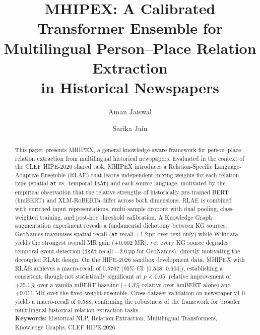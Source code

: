 \documentclass[11pt,a4paper]{article}
\begin{document}
\title{MHIPEX: A Calibrated Transformer Ensemble for\\Multilingual Person--Place Relation Extraction\\in Historical Newspapers}

\author{Aman Jaiswal}
\author{Sarika Jain}
\date{}

\maketitle

\begin{abstract}
This paper presents MHIPEX, a general knowledge-aware framework for person--place relation extraction from multilingual historical newspapers. Evaluated in the context of the CLEF HIPE-2026 shared task, MHIPEX introduces a Relation-Specific Language-Adaptive Ensemble (RLAE) that learns independent mixing weights for each relation type (spatial \texttt{at} vs.\ temporal \texttt{isAt}) and each source language, motivated by the empirical observation that the relative strengths of historically pre-trained BERT (hmBERT) and XLM-RoBERTa differ across both dimensions. RLAE is combined with enriched input representations, multi-sample dropout with dual pooling, class-weighted training, and post-hoc threshold calibration. A Knowledge Graph augmentation experiment reveals a fundamental dichotomy between KG sources: GeoNames maximises spatial recall (\texttt{at} recall +1.2\,pp over text-only) while Wikidata yields the strongest overall MR gain (+0.002 MR), yet every KG source degrades temporal event detection (\texttt{isAt} recall $-$2.0\,pp for GeoNames), directly motivating the decoupled RLAE design. On the HIPE-2026 sandbox development data, MHIPEX with RLAE achieves a macro-recall of 0.5767 (95\% CI: [0.548, 0.604]), establishing a consistent, though not statistically significant at $p<0.05$, relative improvement of +35.1\% over a vanilla mBERT baseline (+4.3\% relative over hmBERT alone) and +0.011 MR over the fixed-weight ensemble. Cross-dataset validation on newspaper v1.0 yields a macro-recall of 0.588, confirming the robustness of the framework for broader multilingual historical relation extraction tasks.\\
\vspace{0.5cm}
\noindent\textbf{Keywords:} Historical NLP, Relation Extraction, Multilingual Transformers, Knowledge Graphs, CLEF HIPE-2026
\end{abstract}
\end{document}

